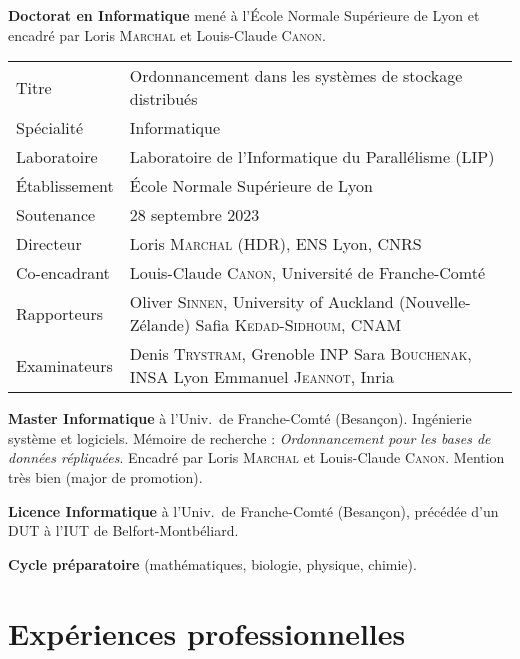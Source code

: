 \documentclass[12pt]{article}
\newcommand{\cvitem}[2]{\item[#1] #2}
\newcounter{cvitems}
\begin{document}
\begin{cvitems}
	\cvitem{2020--2023}{\textbf{Doctorat en Informatique} mené à l'École Normale Supérieure de Lyon et
	encadré par Loris \textsc{Marchal} et Louis-Claude \textsc{Canon}.

	\renewcommand{\arraystretch}{1.4}
	\begin{tabularx}{\linewidth}{@{}lX@{}}
		Titre         & Ordonnancement dans les systèmes de stockage distribués \tabularnewline
		Spécialité    & Informatique \tabularnewline
		Laboratoire   & Laboratoire de l'Informatique du Parallélisme (LIP) \tabularnewline
		Établissement & École Normale Supérieure de Lyon \tabularnewline
		Soutenance    & 28 septembre 2023 \tabularnewline
		Directeur     & Loris \textsc{Marchal} (HDR), ENS Lyon, CNRS \tabularnewline
		Co-encadrant  & Louis-Claude \textsc{Canon}, Université de Franche-Comté \tabularnewline
		Rapporteurs   & Oliver \textsc{Sinnen}, University of Auckland (Nouvelle-Zélande) \newline
		                Safia \textsc{Kedad-Sidhoum}, CNAM \tabularnewline
		Examinateurs  & Denis \textsc{Trystram}, Grenoble INP \newline
		                Sara \textsc{Bouchenak}, INSA Lyon \newline
		                Emmanuel \textsc{Jeannot}, Inria \tabularnewline
	\end{tabularx}}

	\cvitem{2018--2020}{\textbf{Master Informatique} à l'Univ.\ de Franche-Comté (Besançon).  
	Ingénierie système et logiciels.  
	Mémoire de recherche : \emph{Ordonnancement pour les bases de données répliquées}.  
	Encadré par Loris \textsc{Marchal} et Louis-Claude \textsc{Canon}.  
	Mention très bien (major de promotion).}

	\cvitem{2015--2018}{\textbf{Licence Informatique} à l'Univ.\ de Franche-Comté (Besançon), précédée
	d'un DUT à l'IUT de Belfort-Montbéliard.}

	\cvitem{2013-2015}{\textbf{Cycle préparatoire} (mathématiques, biologie, physique, chimie).}
\end{cvitems}

\section{Expériences professionnelles}
\end{document}
